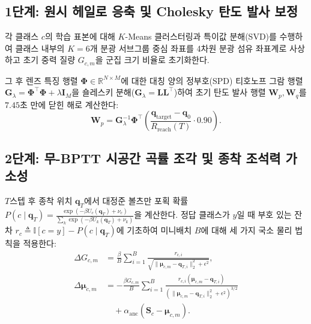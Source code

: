 \documentclass[journal]{IEEEtran}
\begin{document}
\subsection{1단계: 원시 헤일로 응축 및 Cholesky 탄도 발사 보정}
각 클래스 $c$의 학습 표본에 대해 $K$-Means 클러스터링과 특이값 분해(SVD)를 수행하여 클래스 내부의 $K=6$개 분광 서브그룹 중심 좌표를 4차원 분광 섬유 좌표계로 사상하고 초기 중력 질량 $G_{c,m}$을 군집 크기 비율로 초기화한다.

그 후 렌즈 특징 행렬 $\boldsymbol{\Phi} \in \mathbb{R}^{N \times M}$에 대한 대칭 양의 정부호(SPD) 티호노프 그람 행렬 $\mathbf{G}_\lambda = \boldsymbol{\Phi}^\top \boldsymbol{\Phi} + \lambda \mathbf{I}_M$을 숄레스키 분해($\mathbf{G}_\lambda = \mathbf{L}\mathbf{L}^\top$)하여 초기 탄도 발사 행렬 $\mathbf{W}_p, \mathbf{W}_q$를 $7.45$초 만에 닫힌 해로 계산한다:
\begin{equation}
  \mathbf{W}_p = \mathbf{G}_\lambda^{-1} \boldsymbol{\Phi}^\top \left( \frac{\mathbf{q}_{\text{target}} - \mathbf{q}_0}{R_{\text{reach}}(T)} \cdot 0.90 \right).
  \label{eq:cholesky_launch}
\end{equation}

\subsection{2단계: 무-BPTT 시공간 곡률 조각 및 종착 조석력 가소성}
$T$스텝 후 종착 위치 $\mathbf{q}_T$에서 대정준 볼츠만 포획 확률 $P(c \mid \mathbf{q}_T) = \frac{\exp(-\beta U_c(\mathbf{q}_T) + \nu_c)}{\sum_k \exp(-\beta U_k(\mathbf{q}_T) + \nu_k)}$을 계산한다. 정답 클래스가 $y$일 때 부호 있는 잔차 $r_c \triangleq \mathbb{I}[c = y] - P(c \mid \mathbf{q}_T)$에 기초하여 미니배치 $B$에 대해 세 가지 국소 물리 법칙을 적용한다:
\begin{align}
  \Delta G_{c,m} &= \frac{\beta}{B} \sum_{i=1}^B \frac{r_{c,i}}{\sqrt{\|\boldsymbol{\mu}_{c,m} - \mathbf{q}_{T,i}\|_2^2 + \epsilon^2}}, \label{eq:delta_G} \\
  \Delta \boldsymbol{\mu}_{c,m} &= -\frac{\beta G_{c,m}}{B} \sum_{i=1}^B \frac{r_{c,i}(\boldsymbol{\mu}_{c,m} - \mathbf{q}_{T,i})}{\left(\|\boldsymbol{\mu}_{c,m} - \mathbf{q}_{T,i}\|_2^2 + \epsilon^2\right)^{3/2}} \nonumber \\
  &\quad + \alpha_{\text{anc}}(\mathbf{S}_c - \boldsymbol{\mu}_{c,m}). \label{eq:delta_mu}
\end{align}
\end{document}
